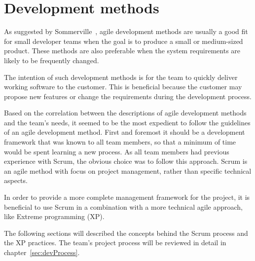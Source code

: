 \section{Development methods}
\label{sec:devMethods}

As suggested by Sommerville~\cite{scrum}, agile development methods are usually a good fit for small developer teams when the goal is to produce a small or medium-sized product. These methods are also preferable when the system requirements are likely to be frequently changed.

The intention of such development methods is for the team to quickly deliver working software to the customer. This is beneficial because the customer may propose new features or change the requirements during the development process.

Based on the correlation between the descriptions of agile development methods and the team's needs, it seemed to be the most expedient to follow the guidelines of an agile development method. First and foremost it should be a development framework that was known to all team members, so that a minimum of time would be spent learning a new process. As all team members had previous experience with Scrum, the obvious choice was to follow this approach. Scrum is an agile method with focus on project management, rather than specific technical aspects.

In order to provide a more complete management framework for the project, it is beneficial to use Scrum in a combination with a more technical agile approach, like Extreme programming (XP).

The following sections will described the concepts behind the Scrum process and the XP practices. The team's project process will be reviewed in detail in chapter~\ref{sec:devProcess}.